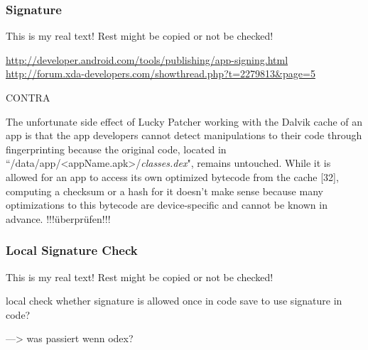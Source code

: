\subsubsection{Signature} \label{subsection:counter-improve-tampering-signature}

This is my real text! Rest might be copied or not be checked!


\url{http://developer.android.com/tools/publishing/app-signing.html}\newline
\url{http://forum.xda-developers.com/showthread.php?t=2279813&page=5}\newline

CONTRA\newline


The unfortunate side effect of Lucky Patcher working with the Dalvik cache of an app is that the app developers cannot detect manipulations to their code through fingerprinting because the original code, located in “/data/app/<appName.apk>/\textit{classes.dex}", remains untouched. While it is allowed for an app to access its own optimized bytecode from the cache [32], computing a checksum or a hash for it doesn't make sense because many optimizations to this bytecode are device-specific and cannot be known in advance.
\cite{munteanLicense}
!!!überprüfen!!!


\subsubsection{Local Signature Check} \label{subsection:counter-tampering-signature-local}
This is my real text! Rest might be copied or not be checked!



local check whether signature is allowed\newline
once in code \newline
save to use signature in code?\newline



---> was passiert wenn odex?
